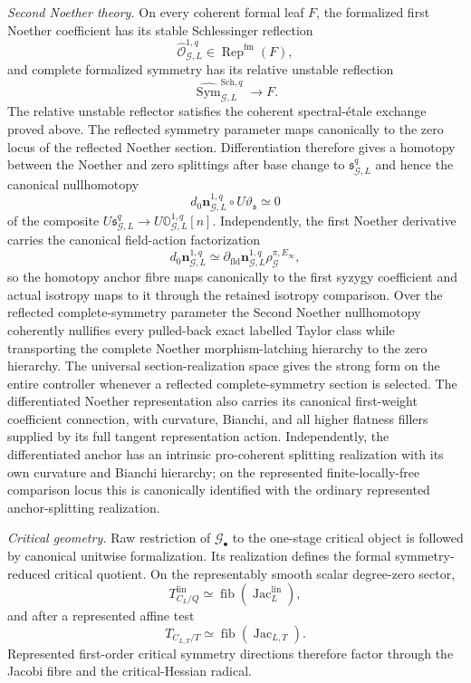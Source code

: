 \begin{theorem}
\medskip
\noindent\emph{Second Noether theory.}
On every coherent formal leaf $F$, the formalized first Noether coefficient has its
stable Schlessinger reflection
\[
\widehat{\mathcal O}_{\mathcal G,L}^{1,q}
\in\operatorname{Rep}^{\mathrm{fm}}(F),
\]
and complete formalized symmetry has its relative unstable reflection
\[
\widehat{\operatorname{Sym}}_{\mathcal G,L}^{\mathrm{Sch},q}\to F.
\]
The relative unstable reflector satisfies the coherent spectral-\'etale exchange
proved above.  The reflected symmetry parameter maps canonically to the zero locus of the reflected
Noether section.  Differentiation therefore gives a homotopy between the Noether
and zero splittings after base change to
$\mathfrak s_{\mathcal G,L}^{q}$ and hence the canonical nullhomotopy
\[
\boxed{
d_0\mathbf n_{\mathcal G,L}^{1,q}
\circ
U\vartheta_{\mathfrak s}
\simeq
0
}
\]
of the composite
$U\mathfrak s_{\mathcal G,L}^{q}\to
U\mathbb O_{\mathcal G,L}^{1,q}[n]$.
Independently, the first Noether derivative carries the canonical field-action
factorization
\[
d_0\mathbf n_{\mathcal G,L}^{1,q}
\simeq
\partial_{\mathrm{fld}}\mathbf n_{\mathcal G,L}^{1,q}
\rho_{\mathcal G}^{\pi,E_\infty},
\]
so the homotopy anchor fibre maps canonically to the first syzygy coefficient and
actual isotropy maps to it through the retained isotropy comparison.  Over the
reflected complete-symmetry parameter the Second Noether nullhomotopy coherently
nullifies every pulled-back exact labelled Taylor class while transporting the
complete Noether morphism-latching hierarchy to the zero hierarchy.  The universal
section-realization space gives the strong form on the entire controller whenever a
reflected complete-symmetry section is selected.  The differentiated Noether
representation also carries its canonical first-weight coefficient connection, with
curvature, Bianchi, and all higher flatness fillers supplied by its full tangent
representation action.  Independently, the differentiated anchor has an intrinsic
pro-coherent splitting realization with its own curvature and Bianchi hierarchy; on
the represented finite-locally-free comparison locus this is canonically identified
with the ordinary represented anchor-splitting realization.

\medskip
\noindent\emph{Critical geometry.}
Raw restriction of $\mathcal G_\bullet$ to the one-stage critical object is followed
by canonical unitwise formalization.  Its realization defines the formal
symmetry-reduced critical quotient.  On the representably smooth scalar degree-zero
sector,
\[
T_{C_L/Q}^{\mathrm{lin}}
\simeq
\operatorname{fib}(\operatorname{Jac}^{\mathrm{lin}}_L),
\]
and after a represented affine test
\[
T_{C_{L,T}/T}
\simeq
\operatorname{fib}(\operatorname{Jac}_{L,T}).
\]
Represented first-order critical symmetry directions therefore factor through the
Jacobi fibre and the critical-Hessian radical.


\end{theorem}
